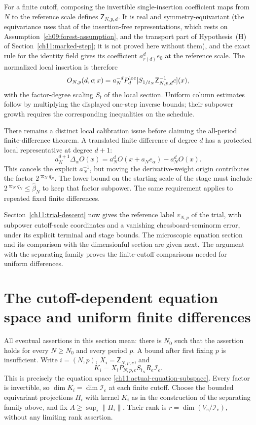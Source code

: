 For a finite cutoff, composing the invertible single-insertion coefficient
maps from $N$ to the reference scale defines
$\mathsf Z_{N,p,d}$. It is real and symmetry-equivariant (the equivariance uses that of the insertion-free representations, which rests on Assumption~\ref{ch09:forest-assumption}, and the transport part of Hypothesis~(H) of Section~\ref{ch11:marked-step}; it is not proved here without them), and the exact
rule for the identity field gives its coefficient $a_{r(d)}^de_0$ at the reference scale.
The normalized local insertion is therefore
\[
 O_{N,p}(d,c;x)=a_N^{-d}
       P_d^{\rm loc}[S_{1/t_N}\mathsf Z_{N,p,d}^{-1}c](x),
\]
with the factor-degree scaling $S_t$ of the local section.
Uniform column estimates follow by multiplying the displayed
one-step inverse bounds; their subpower growth requires the
corresponding inequalities on the schedule.

There remains a distinct local calibration issue before claiming the
all-period finite-difference theorem. A translated finite difference
of degree $d$ has a protected local representative at degree $d+1$:
\[
 a_N^{d+1}\Delta_\alpha O(x)
 =a_N^dO(x+a_Ne_\alpha)-a_N^dO(x).
\]
This cancels the explicit $a_N^{-1}$, but moving the derivative-weight
origin contributes the factor $2^{\varpi_N q_N}$.
The lower bound on the starting scale of the stage must include
$2^{\varpi_Nq_N}\le\widehat\beta_N$ to keep that factor subpower.
The same requirement applies to repeated fixed finite differences.

Section~\ref{ch11:trial-descent} now gives the reference label $v_{N,p}$ of the trial, with
subpower cutoff-scale coordinates and a vanishing chessboard-seminorm
error, under its explicit terminal and stage bounds.
The microscopic equation section and its comparison with the dimensionful
section are given next. The argument with the separating family proves the finite-cutoff comparisons
needed for uniform differences.



\section{The cutoff-dependent equation space and uniform finite differences}
\label{ch11:uniform-differences}

All eventual assertions in this section mean: there is $N_0$ such
that the assertion holds for every $N\ge N_0$ and every period $p$.
A bound after first fixing $p$ is insufficient.
Write $i=(N,p)$, $X_i=\mathsf Z_{N,p,e}$, and
\[
 K_i=X_iP_{N,p,e}S_{t_N}R_e\mathcal I_e.
\]
This is precisely the equation space
\eqref{ch11:actual-equation-subspace}. Every factor is invertible,
so $\dim K_i=\dim\mathcal I_e$ at each finite cutoff.
Choose the bounded equivariant projections $\Pi_i$ with kernel $K_i$
as in the construction of the separating family above, and fix
$A\ge\sup_i\|\Pi_i\|$. Their rank is
$r=\dim(V_e/\mathcal I_e)$, without any limiting rank assertion.

